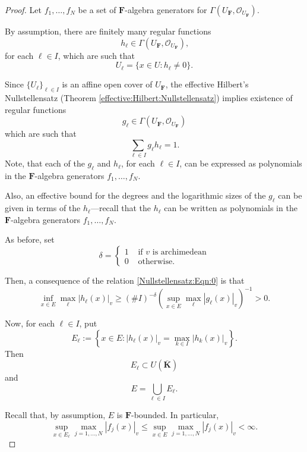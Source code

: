 \documentclass[10pt]{amsart}
\renewcommand{\geq}{\geqslant}
\renewcommand{\leq}{\leqslant}
\newcommand{\Osh}{{\mathcal O}}                        %
\newcommand{\KK}{\mathbf{K}}
\newcommand{\FF}{\mathbf{F}}
\theoremstyle{definition}
\numberwithin{equation}{section}
\begin{document}
\begin{proof}

Let $f_1,\dots,f_N$ be a set of $\FF$-algebra generators for $\Gamma(U_{\FF},\Osh_{U_{\FF}})$.  

By assumption, there are finitely many regular functions 
$$h_\ell \in \Gamma(U_{\FF},\Osh_{U_{\FF}})\text{,}$$ 
for each $\ell \in I$, which are such that 
$$
U_{\ell} = \{x \in U : h_\ell \not = 0 \} \text{.}
$$

Since $\{U_\ell \}_{\ell \in I}$ is an affine open cover of $U_{\FF}$, the effective Hilbert's Nullstellensatz (Theorem \ref{effective:Hilbert:Nullstellensatz})  implies existence of regular functions 
$$g_\ell \in \Gamma(U_{\FF},\Osh_{U_{\FF}})$$ 
which are such that 
\begin{equation}\label{Nullstellensatz:Eqn:0}
\sum_{\ell \in I} g_\ell h_\ell = 1 \text{.}
\end{equation}
Note, that each of the $g_\ell$ and $h_\ell$, for each $\ell \in I$, can be expressed as polynomials in the $\FF$-algebra generators $f_1,\dots,f_N$.  

Also, an effective bound for the degrees and the logarithmic sizes of the $g_\ell$ can be given in terms of the $h_\ell$---recall that the $h_\ell$ can be written as polynomials in the $\FF$-algebra generators $f_1,\dots,f_N$.

As before, set
$$
\delta =
\begin{cases}
1 & \text{ if $v$ is archimedean} \\
0 & \text{ otherwise} \text{.}
\end{cases}
$$

Then, a consequence of the relation \eqref{Nullstellensatz:Eqn:0} is that 
\begin{equation}\label{Nullstellensatz:Eqn:1}
\inf_{x \in E} \max_\ell | h_\ell(x)|_v \geq \left(\# I  \right)^{-\delta} \left(\sup_{x \in E} \max_\ell |g_\ell(x)|_v \right)^{-1} > 0 \text{.}
\end{equation}

Now, for each $\ell \in I$, put
$$
E_\ell := \left\{x \in E : |h_\ell(x)|_v = \max_{k \in I} |h_k(x)|_v \right\} \text{.}
$$
Then
$$
E_{\ell} \subset U(\overline{\KK}) 
$$
and
$$
E = \bigcup_{\ell \in I} E_\ell \text{.}
$$

Recall that, by assumption, $E$ is $\FF$-bounded.  In particular,
\begin{equation}\label{Nullstellensatz:Eqn:2}
\sup_{x \in E_{\ell}} \max_{j=1,\dots,N} |f_j(x)|_v \leq \sup_{x \in E} \max_{j=1,\dots,N} |f_j(x)|_v < \infty \text{.}
\end{equation}


\end{proof}
\end{document}
